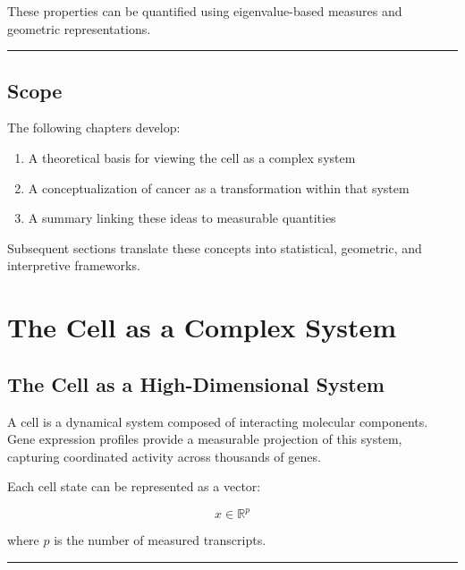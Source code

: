 \documentclass[
  letterpaper,
  DIV=11,
  numbers=noendperiod,
  openany,
  oneside]{scrreprt}
\providecommand{\tightlist}{%
  \setlength{\itemsep}{0pt}\setlength{\parskip}{0pt}}
\begin{document}
These properties can be quantified using eigenvalue-based measures and
geometric representations.

\begin{center}\rule{0.5\linewidth}{0.5pt}\end{center}

\section{Scope}\label{scope}

The following chapters develop:

\begin{enumerate}
\def\labelenumi{\arabic{enumi}.}
\tightlist
\item
  A theoretical basis for viewing the cell as a complex system\\
\item
  A conceptualization of cancer as a transformation within that system\\
\item
  A summary linking these ideas to measurable quantities
\end{enumerate}

Subsequent sections translate these concepts into statistical,
geometric, and interpretive frameworks.

\chapter{The Cell as a Complex
System}\label{the-cell-as-a-complex-system}

\section{The Cell as a High-Dimensional
System}\label{the-cell-as-a-high-dimensional-system}

A cell is a dynamical system composed of interacting molecular
components. Gene expression profiles provide a measurable projection of
this system, capturing coordinated activity across thousands of genes.

Each cell state can be represented as a vector:

\[
x \in \mathbb{R}^p
\]

where \(p\) is the number of measured transcripts.

\begin{center}\rule{0.5\linewidth}{0.5pt}\end{center}
\end{document}
